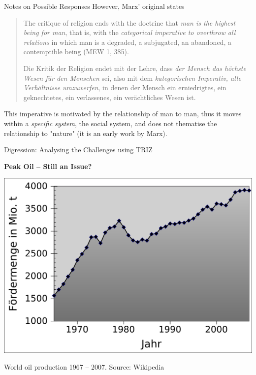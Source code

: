 \documentclass{beamer}
\newcommand{\ueberschrift}[1]{\begin{center}\bf #1\end{center}}
\begin{document}
\begin{frame}{Notes on Possible Responses}
  However, Marx' original states
  \begin{quote}\rm
    The critique of religion ends with the doctrine that \emph{man is the
      highest being for man}, that is, with the \emph{categorical imperative
      to overthrow all relations} in which man is a degraded, a subjugated, an
    abandoned, a contemptible being (MEW 1, 385).\medskip

    Die Kritik der Religion endet mit der Lehre, dass \emph{der Mensch das
      höchste Wesen für den Menschen} sei, also mit dem \emph{kategorischen
      Imperativ, alle Verhältnisse umzuwerfen}, in denen der Mensch ein
    erniedrigtes, ein geknechtetes, ein verlassenes, ein verächtliches Wesen
    ist.
  \end{quote}
  This imperative is motivated by the relationship of man to man, thus it
  moves within a \emph{specific system}, the social system, and does not
  thematise the relationship to "nature" (it is an early work by Marx).
\end{frame}

\begin{frame}{Digression: Analysing the Challenges using TRIZ}

  \ueberschrift{Peak Oil -- Still an Issue?}

  \begin{center}
    \includegraphics[width=.6\textwidth]{Bilder/9B7Cna.png}
  
    World oil production 1967 -- 2007. Source: Wikipedia
  \end{center}
\end{frame}
\end{document}
